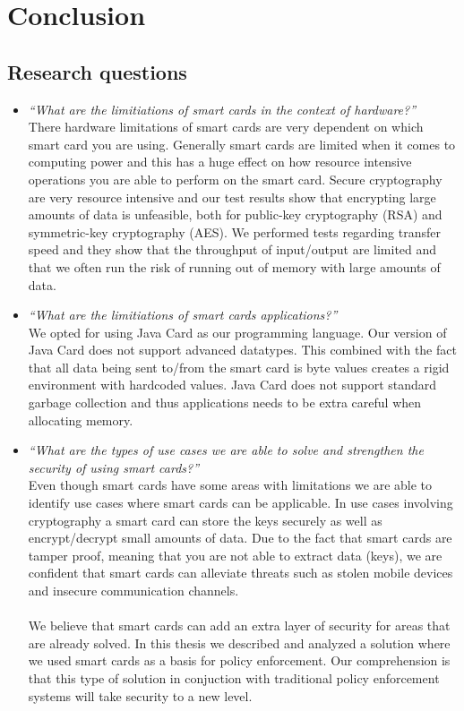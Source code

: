 \chapter{Conclusion}
\label{ch:conclusion}

\section{Research questions}
\begin{itemize}
  \item \textit{``What are the limitiations of smart cards in the context of hardware?''}\\
  There hardware limitations of smart cards are very dependent on which smart card you are using. Generally smart cards are limited when it comes to computing power and this has a huge effect on how resource intensive operations you are able to perform on the smart card. Secure cryptography are very resource intensive and our test results show that encrypting large amounts of data is unfeasible, both for public-key cryptography (RSA) and symmetric-key cryptography (AES). We performed tests regarding transfer speed and they show that the throughput of input/output are limited and that we often run the risk of running out of memory with large amounts of data.
  \item \textit{``What are the limitiations of smart cards applications?''}\\
  We opted for using Java Card as our programming language. Our version of Java Card does not support advanced datatypes. This combined with the fact that all data being sent to/from the smart card is byte values creates a rigid environment with hardcoded values. Java Card does not support standard garbage collection and thus applications needs to be extra careful when allocating memory.
  \item \textit{``What are the types of use cases we are able to solve and strengthen the security of using smart cards?''}\\
  Even though smart cards have some areas with limitations we are able to identify use cases where smart cards can be applicable. In use cases involving cryptography a smart card can store the keys securely as well as encrypt/decrypt small amounts of data. Due to the fact that smart cards are tamper proof, meaning that you are not able to extract data (keys), we are confident that smart cards can alleviate threats such as stolen mobile devices and insecure communication channels.\mbox{}\\\\  We believe that smart cards can add an extra layer of security for areas that are already solved. In this thesis we described and analyzed a solution where we used smart cards as a basis for policy enforcement. Our comprehension is that this type of solution in conjuction with traditional policy enforcement systems will take security to a new level.
\end{itemize}

